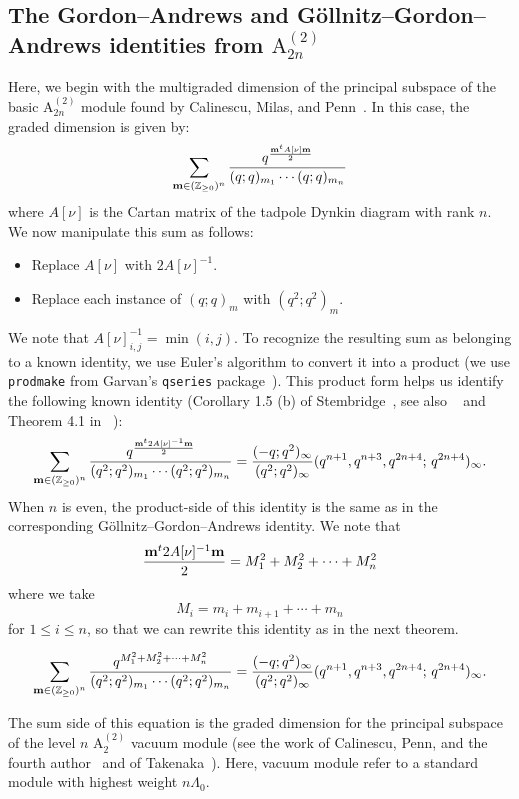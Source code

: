 \documentclass[ALCO,Unicode,published]{cedram}
\begin{document}
\subsection{The Gordon--Andrews and  G\"ollnitz--Gordon--Andrews identities from \texorpdfstring{$\mathrm{A}_{2n}^{(2)}$}{A2n(2)}}
Here, we begin with the multigraded dimension of the principal subspace of the basic $\mathrm{A}_{2n}^{(2)}$ module found by Calinescu, Milas, and Penn~\cite{CalMPe}. In this case, the graded dimension is given by:
\begin{equation}
\sum_{{\bf m} \in (\mathbb{Z}_{\ge 0})^{n}}
\frac{q^{\frac{{\bf m}^t A[\nu]{\bf m}}{2}}}{{(q};q)_{m_1}\cdots (q;q)_{m_{n}}}
\end{equation}
where $A[\nu]$ 
is the Cartan matrix of the tadpole Dynkin diagram with rank $n$.
We now manipulate this sum as follows:
\begin{itemize}
\item Replace $A[\nu]$ with $2A[\nu]^{-1}$.
\item Replace each instance of $(q;q)_m$ with $(q^2;q^2)_m$.
\end{itemize}
We note that $A[\nu]^{-1}_{i,j} = \min (i,j)$.
To recognize the resulting sum as belonging to a known identity, we use Euler's algorithm to convert it into a product (we use \texttt{prodmake} from Garvan's {\tt qseries} package~\cite{Ga}). 
This product form helps us identify the following known identity (Corollary 1.5 (b) of Stembridge~\cite{S}, see also ~\cite{BIS} and Theorem 4.1 in ~\cite{War1}):
\begin{equation}
\sum_{{\bf m} \in (\mathbb{Z}_{\ge 0})^{n}}\frac{q^{\frac{{\bf m}^t 2A[\nu]^{-1}{\bf m}}{2}}}{{(q^2};q^2)_{m_1}\cdots (q^2;q^2)_{m_{n}}} =\frac{(-q;q^2)_\infty}{(q^2;q^2)_\infty} 
(q^{n+1},q^{n+3},q^{2n+4};\,q^{2n+4})_\infty.
\end{equation}
When $n$ is even, the product-side of this identity is the same as in the corresponding G\"ollnitz--Gordon--Andrews identity.
We note that 
$$
\frac{{\bf m}^t 2A[\nu]^{-1}{\bf m}}{2} = M_1^2 + M_2^2+ \cdots + M_n^2
$$
where we take 
\begin{equation}\label{big-M}
M_i = m_i + m_{i+1} + \cdots + m_n
\end{equation}
 for $1 \le i \le n$,
so that we can rewrite this identity as in the next theorem.
\begin{thm}
\begin{equation}
\sum_{{\bf m} \in (\mathbb{Z}_{\ge 0})^{n}}\frac{q^{M_1^2 + M_2^2 + \cdots + M_n^2}}{{(q^2};q^2)_{m_1}\cdots (q^2;q^2)_{m_{n}}} 
=\frac{(-q;q^2)_\infty}{(q^2;q^2)_\infty} (q^{n+1},q^{n+3},q^{2n+4};\,q^{2n+4})_\infty.
\end{equation}
\end{thm}
The sum side of this equation is the graded dimension for the principal subspace of the level $n$
$\mathrm{A}_2^{(2)}$ vacuum module (see the work of Calinescu, Penn, and the fourth author~\cite{CPS} and of Takenaka~\cite{Ta}).
Here, vacuum module refer to a standard module with highest weight $n\Lambda_0$.
\end{document}
